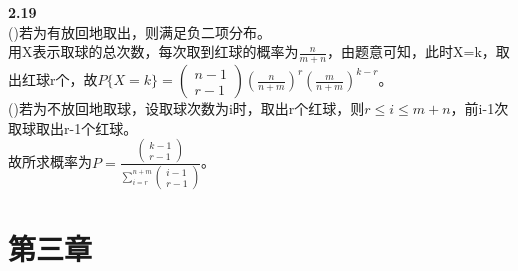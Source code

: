 \documentclass{book}%
\begin{document}
	{\bfseries 2.19}\\
	()若为有放回地取出，则满足负二项分布。\\
	用X表示取球的总次数，每次取到红球的概率为$\frac{n}{m+n}$，由题意可知，此时X=k，取出红球r个，故$P\{X=k\}=\begin{pmatrix}
		n-1\\r-1
	\end{pmatrix}(\frac{n}{n+m})^{r}(\frac{m}{n+m})^{k-r}$。\\
	()若为不放回地取球，设取球次数为i时，取出r个红球，则$r \le i\le m+n$，前i-1次取球取出r-1个红球。\\
	故所求概率为$P=\frac{\begin{pmatrix}
			k-1\\r-1
	\end{pmatrix}}{\sum\limits_{i=r}^{n+m}\begin{pmatrix}
	i-1\\r-1
	\end{pmatrix}}$。\\

	\chapter{第三章}
\end{document}
